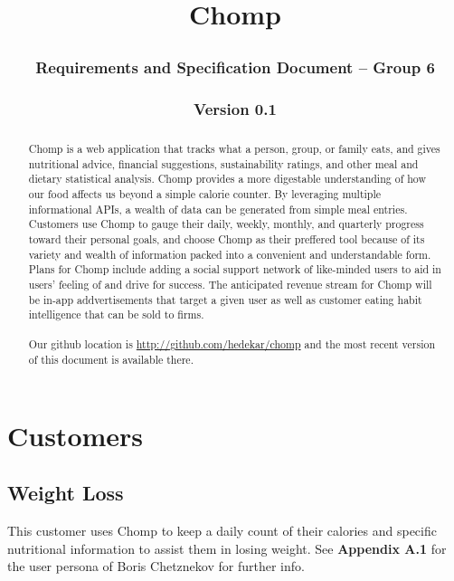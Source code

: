 \documentclass[a4paper,12pt]{article}
\begin{document}
\title{Chomp
\subsubsection*{Requirements and Specification Document -- Group 6}\subsubsection*{Version 0.1}
}\maketitle

\renewcommand{\abstractname}{Project Abstract}
\begin{abstract}

Chomp is a web application that tracks what a person, group, or family eats, and gives nutritional advice, financial suggestions, sustainability ratings, and other meal and dietary statistical analysis.  Chomp provides a more digestable understanding of how our food affects us beyond a simple calorie counter.  By leveraging multiple informational APIs, a wealth of data can be generated from simple meal entries.  Customers use Chomp to gauge their daily, weekly, monthly, and quarterly progress toward their personal goals, and choose Chomp as their preffered tool because of its variety and wealth of information packed into a convenient and understandable form.  Plans for Chomp include adding a social support network of like-minded users to aid in users' feeling of and drive for success.  The anticipated revenue stream for Chomp will be in-app addvertisements that target a given user as well as customer eating habit intelligence that can be sold to firms.\\
\\
Our github location is \url{http://github.com/hedekar/chomp} and the most recent version of this document is available there.
\end{abstract}
\newpage
\tableofcontents
\newpage
\section{Customers}
\subsection{Weight Loss}
This customer uses Chomp to keep a daily count of their calories and specific nutritional information to assist them in losing weight.  See \textbf{Appendix A.1} for the user persona of Boris Chetznekov for further info.
\end{document}
